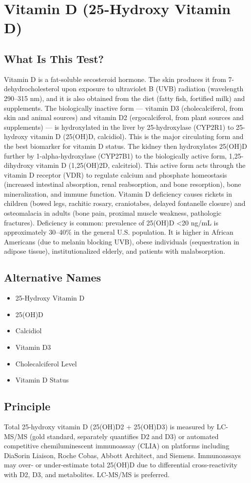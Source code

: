 \chapter{Vitamin D (25-Hydroxy Vitamin D)}
\section*{What Is This Test?}
Vitamin D is a fat-soluble secosteroid hormone. The skin produces it from 7-dehydrocholesterol upon exposure to ultraviolet B (UVB) radiation (wavelength 290--315 nm), and it is also obtained from the diet (fatty fish, fortified milk) and supplements. The biologically inactive form --- vitamin D3 (cholecalciferol, from skin and animal sources) and vitamin D2 (ergocalciferol, from plant sources and supplements) --- is hydroxylated in the liver by 25-hydroxylase (CYP2R1) to 25-hydroxy vitamin D (25(OH)D, calcidiol). This is the major circulating form and the best biomarker for vitamin D status. The kidney then hydroxylates 25(OH)D further by 1-alpha-hydroxylase (CYP27B1) to the biologically active form, 1,25-dihydroxy vitamin D (1,25(OH)2D, calcitriol). This active form acts through the vitamin D receptor (VDR) to regulate calcium and phosphate homeostasis (increased intestinal absorption, renal reabsorption, and bone resorption), bone mineralization, and immune function. Vitamin D deficiency causes rickets in children (bowed legs, rachitic rosary, craniotabes, delayed fontanelle closure) and osteomalacia in adults (bone pain, proximal muscle weakness, pathologic fractures). Deficiency is common: prevalence of 25(OH)D <20 ng/mL is approximately 30--40\% in the general U.S. population. It is higher in African Americans (due to melanin blocking UVB), obese individuals (sequestration in adipose tissue), institutionalized elderly, and patients with malabsorption.
\section*{Alternative Names}
\begin{itemize}
  \item 25-Hydroxy Vitamin D
  \item 25(OH)D
  \item Calcidiol
  \item Vitamin D3
  \item Cholecalciferol Level
  \item Vitamin D Status
\end{itemize}
\section*{Principle}
Total 25-hydroxy vitamin D (25(OH)D2 + 25(OH)D3) is measured by LC-MS/MS (gold standard, separately quantifies D2 and D3) or automated competitive chemiluminescent immunoassay (CLIA) on platforms including DiaSorin Liaison, Roche Cobas, Abbott Architect, and Siemens. Immunoassays may over- or under-estimate total 25(OH)D due to differential cross-reactivity with D2, D3, and metabolites. LC-MS/MS is preferred.
